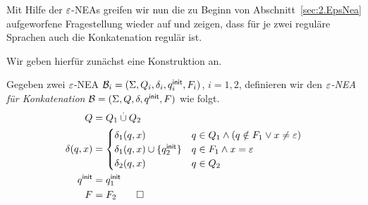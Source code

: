 \medskip

Mit Hilfe der $\varepsilon$-NEAs greifen wir nun die zu Beginn von Abschnitt~\ref{sec:2.EpsNea} aufgeworfene Fragestellung wieder auf und zeigen, dass für je zwei reguläre Sprachen auch die Konkatenation regulär ist.

Wir geben hierfür zunächst eine Konstruktion an.

\begin{Def}
Gegeben zwei $\varepsilon$-NEA $\mathcal{B}_i= (\Sigma, Q_i,\delta_i,q^\mathsf{init}_i,F_i)$, $i = 1,2$, definieren wir den \emph{$\varepsilon$-NEA für Konkatenation} $\mathcal{B}= (\Sigma, Q,\delta,q^\mathsf{init},F)$ wie folgt.
                \begin{align*}
                Q &= Q_1 \overset.\cup Q_2\\
                \delta(q,x) &=
                                \begin{cases}
                                        \delta_1(q,x) & q\in Q_1\land (q\notin F_1 \lor x\neq \varepsilon)\\
                                        \delta_1(q,x)\cup\{q^\mathsf{init}_2\} & q\in F_1\land x=\varepsilon\\
                                        \delta_2(q,x) & q\in Q_2
                                \end{cases}\\
                q^\mathsf{init} & = q^\mathsf{init}_1\\
                F &= F_2 \qedhere
                \end{align*}
\end{Def}

